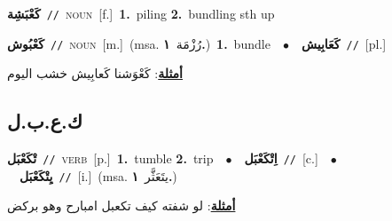 \documentclass[10pt,a4paper,twoside]{article} %
\begin{document}
\begin{multicols}{2}
{\setlength\topsep{0pt}\textbf{\foreignlanguage{arabic}{كَعْبَشِة}}\ {\color{gray}\texttt{//}\color{black}}\ \textsc{noun}\ [f.]\ \textbf{1.}~piling  \textbf{2.}~bundling sth up\ } \vspace{2mm}

{\setlength\topsep{0pt}\textbf{\foreignlanguage{arabic}{كَعْبُوش}}\ {\color{gray}\texttt{//}\color{black}}\ \textsc{noun}\ [m.]\ \color{gray}(msa. \foreignlanguage{arabic}{رُزْمَة}~\foreignlanguage{arabic}{\textbf{١.}})\color{black}\ \textbf{1.}~bundle\ \ $\bullet$\ \ \setlength\topsep{0pt}\textbf{\foreignlanguage{arabic}{كَعَابِيش}}\ {\color{gray}\texttt{//}\color{black}}\ [pl.]\  \begin{flushright}\color{gray}\foreignlanguage{arabic}{\textbf{\underline{\foreignlanguage{arabic}{أمثلة}}}: كَعْوَشنا كَعابِيش خشب اليوم}\end{flushright}\color{black}} \vspace{2mm}

\vspace{-3mm}
\subsection*{\color{blue}\foreignlanguage{arabic}{ك.ع.ب.ل}\color{blue}{}} 

{\setlength\topsep{0pt}\textbf{\foreignlanguage{arabic}{تْكَعْبَل}}\ {\color{gray}\texttt{//}\color{black}}\ \textsc{verb}\ [p.]\ \textbf{1.}~tumble  \textbf{2.}~trip\ \ $\bullet$\ \ \setlength\topsep{0pt}\textbf{\foreignlanguage{arabic}{اِتْكَعْبَل}}\ {\color{gray}\texttt{//}\color{black}}\ [c.]\ \ $\bullet$\ \ \setlength\topsep{0pt}\textbf{\foreignlanguage{arabic}{يِتْكَعْبَل}}\ {\color{gray}\texttt{//}\color{black}}\ [i.]\ \color{gray}(msa. \foreignlanguage{arabic}{يتَعَثَّر}~\foreignlanguage{arabic}{\textbf{١.}})\color{black}\  \begin{flushright}\color{gray}\foreignlanguage{arabic}{\textbf{\underline{\foreignlanguage{arabic}{أمثلة}}}: لو شفته كيف تكعبل امبارح وهو بركض}\end{flushright}\color{black}} \vspace{2mm}


\end{multicols}
\end{document}
